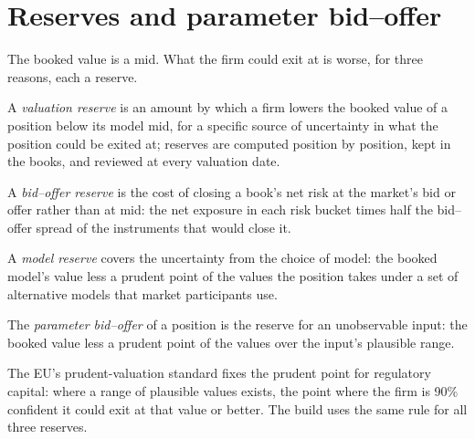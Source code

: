 \section{Reserves and parameter bid--offer}

The booked value is a mid. What the firm could exit at is worse, for three reasons, each a reserve.

\begin{definition}\label{def:dv:managing-an-exotic-book:reserve}
A \emph{valuation reserve} is an amount by which a firm lowers the booked value of a position below its model mid, for a
specific source of uncertainty in what the position could be exited at; reserves are computed position by position, kept in the books, and reviewed at
every valuation date.
\end{definition}

\begin{definition}\label{def:dv:managing-an-exotic-book:bidoffer}
A \emph{bid--offer reserve} is the cost of closing a book's net risk at the market's bid or offer rather than at mid: the net
exposure in each risk bucket times half the bid--offer spread of the instruments that would close it.
\end{definition}

\begin{definition}\label{def:dv:managing-an-exotic-book:model}
A \emph{model reserve} covers the uncertainty from the choice of model: the booked model's value less a prudent point of the values
the position takes under a set of alternative models that market participants use.
\end{definition}

\begin{definition}\label{def:dv:managing-an-exotic-book:param}
The \emph{parameter bid--offer} of a position is the reserve for an unobservable input: the booked value less a prudent point of
the values over the input's plausible range.
\end{definition}

The EU's prudent-valuation standard fixes the prudent point for regulatory capital: where a range of plausible values exists, the point where the firm is
90\% confident it could exit at that value or better. The build uses the same rule for all three reserves.

